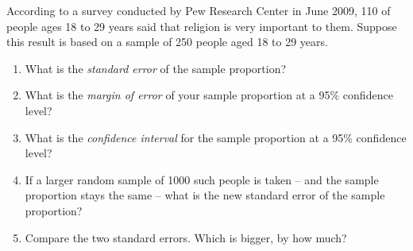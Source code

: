\documentclass[11pt, chapterprefix=true]{scrbook}\usepackage[]{graphicx}\usepackage[]{color}
\begin{document}
\begin{exercises}
\begin{exercise}
\begin{center}
\end{center}

According to a survey conducted by Pew Research Center in June 2009, 110 of people ages 18 to 29 years said that religion is very important to them. Suppose this result is based on a sample of 250 people aged 18 to 29 years.

\begin{enumerate}
\item What is the \textit{standard error} of the sample proportion?
\item What is the \textit{margin of error} of your sample proportion at a 95\% confidence level?
\item What is the \textit{confidence interval} for the sample proportion at a 95\% confidence level?
\item If a larger random sample of 1000 such people is taken -- and the sample proportion stays the same -- what is the new standard error of the sample proportion?
\item Compare the two standard errors. Which is bigger, by how much?
\end{enumerate}

\end{exercise} 
\begin{solution}  %



\end{solution}
\end{exercises}
\end{document}
